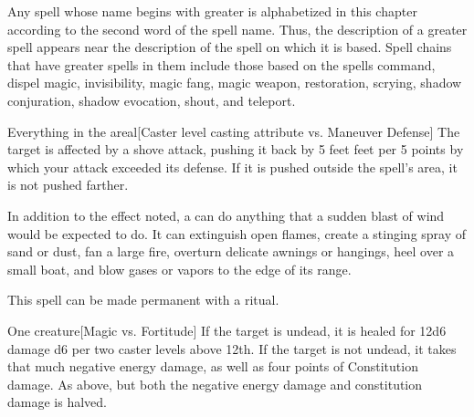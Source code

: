 \par Any spell whose name begins with greater is alphabetized in this chapter according to the second word of the spell name. Thus, the description of a greater spell appears near the description of the spell on which it is based. Spell chains that have greater spells in them include those based on the spells command, dispel magic, invisibility, magic fang, magic weapon, restoration, scrying, shadow conjuration, shadow evocation, shout, and teleport.

\begin{spelltarget}{Everything in the area}l[Caster level \add casting attribute vs. Maneuver Defense]
    \spellsuccess The target is affected by a shove attack, pushing it back by 5 feet  feet per 5 points by which your attack exceeded its defense. If it is pushed outside the spell's area, it is not pushed farther.
\end{spelltarget}
\spellnotes In addition to the effect noted, a  can do anything that a sudden blast of wind would be expected to do. It can extinguish open flames, create a stinging spray of sand or dust, fan a large fire, overturn delicate awnings or hangings, heel over a small boat, and blow gases or vapors to the edge of its range.

This spell can be made permanent with a  ritual.

\begin{comment}
\subsubsection{H}
\end{comment}

\spellrng{\rngclose}
\begin{spelltarget}{One creature}[Magic vs. Fortitude]
    \spelleffect If the target is undead, it is healed for 12d6 damage \add d6 per two caster levels above 12th.
    \spellsuccess If the target is not undead, it takes that much negative energy damage, as well as four points of Constitution damage.
    \spellfailure As above, but both the negative energy damage and constitution damage is halved.
\end{spelltarget}

